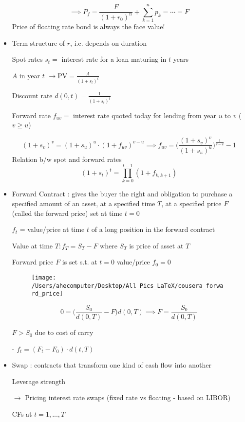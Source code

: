 \documentclass{article}
\begin{document}
\begin{itemize}
$$\implies P_f = \frac{F}{(1+r_0)^{n}} + \sum\limits_{k=1}^{n} p_k
 = \cdots = F
$$
Price of floating rate bond is always the face value!

\item Term structure of $r$, i.e. depends on duration

Spot rates $s_t =$ interest rate for a loan maturing in $t$ years

$A$ in year $t$ $\rightarrow \text{PV} = \frac{A}{(1+s_t)^{t}}$

Discount rate $d(0,t) = \frac{1}{(1+s_t)^{t}}$

Forward rate $f_{uv} =$ interest rate quoted today for lending from year $u$ to $v$ ($v \geq u$)

$$(1+s_v)^{v} = (1+s_u)^{u} \cdot (1 + f_{uv})^{v-u}
\implies
f_{uv} = \Big( \frac{(1+s_v)^{v}}{(1+s_u)^{u}} \Big)^{\frac{1}{v-u}} - 1
$$
Relation b/w spot and forward rates
$$(1+s_t)^{t} = \prod_{k=0}^{t-1} (1 + f_{k, k+1})
$$

\item {} Forward Contract : gives the buyer the right and obligation to purchase a specified amount of an asset, at a specified time $T$, at a specified price $F$ (called the forward price) set at time $t = 0$

$f_t$ = value/price at time $t$ of a long position in the forward contract

Value at time $T : f_T = S_T - F$ where $S_T$ is price of asset at $T$

Forward price $F$ is set s.t. at $t=0$ value/price $f_0 = 0$

\begin{figure}[h!]
  \texttt{[image: /Users/ahecomputer/Desktop/All\_Pics\_LaTeX/cousera\_forward\_price]}
\end{figure}

$$0 = \Big(\frac{S_0}{d(0,T)} - F\Big) d(0,T) \implies F = \frac{S_0}{d(0,T)}$$

$F > S_0$ due to cost of carry

- $f_t = (F_t - F_0) \cdot d(t, T)$

\item {} Swap : contracts that transform one kind of cash flow into another

Leverage strength

$\rightarrow$ Pricing interest rate swaps (fixed rate vs floating - based on LIBOR)

CFs at $t = 1, ..., T$


\end{itemize}
\end{document}
